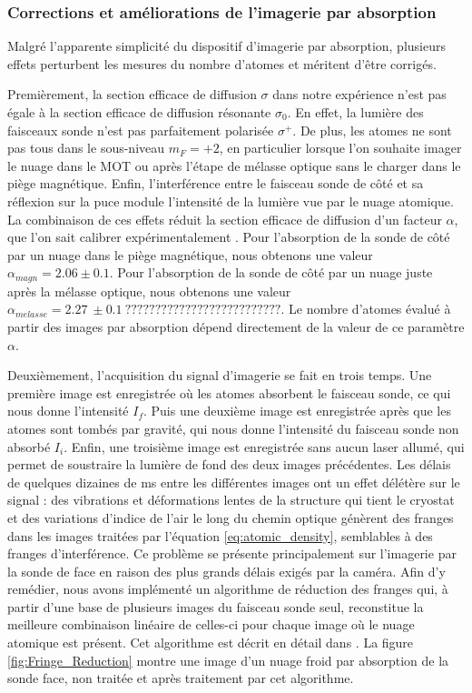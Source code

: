 \subsubsection*{Corrections et améliorations de l'imagerie par absorption}
\noindent Malgré l'apparente simplicité du dispositif d'imagerie par absorption, plusieurs effets perturbent les mesures du nombre d'atomes et méritent d'être corrigés.

Premièrement, la section efficace de diffusion $\sigma$ dans notre expérience n'est pas égale à la section efficace de diffusion résonante $\sigma_0$.
En effet, la lumière des faisceaux sonde n'est pas parfaitement polarisée $\sigma^+$.
De plus, les atomes ne sont pas tous dans le sous-niveau $m_F=+2$, en particulier lorsque l'on souhaite imager le nuage dans le MOT ou après l'étape de mélasse optique sans le charger dans le piège magnétique.
Enfin, l'interférence entre le faisceau sonde de côté et sa réflexion sur la puce module l'intensité de la lumière vue par le nuage atomique.
La combinaison de ces effets réduit la section efficace de diffusion d'un facteur $\alpha$, que l'on sait calibrer expérimentalement \cite{PHD_CELISTRINO,MX_GUERYODELIN_SATABSIM}.
Pour l'absorption de la sonde de côté par un nuage dans le piège magnétique, nous obtenons une valeur $\alpha_{magn} = \num{2.06} \pm \num{0.1}$.
Pour l'absorption de la sonde de côté par un nuage juste après la mélasse optique, nous obtenons une valeur $\alpha_{melasse} = \SI{2.27}{} \pm \SI{0.1}{}??????????????????????????$.
Le nombre d'atomes évalué à partir des images par absorption dépend directement de la valeur de ce paramètre $\alpha$.
	
Deuxièmement, l'acquisition du signal d'imagerie se fait en trois temps.
Une première image est enregistrée où les atomes absorbent le faisceau sonde, ce qui nous donne l'intensité $I_f$.
Puis une deuxième image est enregistrée après que les atomes sont tombés par gravité, qui nous donne l'intensité du faisceau sonde non absorbé $I_i$.
Enfin, une troisième image est enregistrée sans aucun laser allumé, qui permet de soustraire la lumière de fond 
des deux images précédentes.
Les délais de quelques dizaines de \si{\ms} entre les différentes images ont un effet délétère sur le signal : des vibrations et déformations lentes de la structure qui tient le cryostat et des variations d'indice de l'air le long du chemin optique génèrent des franges dans les images traitées par l'équation \eqref{eq:atomic_density}, semblables à des franges d'interférence.
Ce problème se présente principalement sur l'imagerie par la sonde de face en raison des plus grands délais exigés par la caméra.
Afin d'y remédier, nous avons implémenté un algorithme de réduction des franges qui, à partir d'une base de plusieurs images du faisceau sonde seul, reconstitue la meilleure combinaison linéaire de celles-ci pour chaque image où le nuage atomique est présent. Cet algorithme est décrit en détail dans \cite{MX_WHITLOCK_FRINGEREDUCTION}.
La figure \eqref{fig:Fringe_Reduction} montre une image d'un nuage froid par absorption de la sonde face, non traitée et après traitement par cet algorithme.

